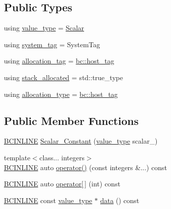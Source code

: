 \subsection*{Public Types}
\begin{DoxyCompactItemize}
\item 
using \hyperlink{structbc_1_1tensors_1_1exprs_1_1Scalar__Constant_a5ff7d788cce7d13ba21b5a421cb53036}{value\+\_\+type} = \hyperlink{namespacebc_aa12ac55ee2c43dc082894dd3859daee1}{Scalar}
\item 
using \hyperlink{structbc_1_1tensors_1_1exprs_1_1Scalar__Constant_a06478729344f3ef5709f7a44075d76ba}{system\+\_\+tag} = System\+Tag
\item 
using \hyperlink{structbc_1_1tensors_1_1exprs_1_1Scalar__Constant_ade9d036a5efd1c6d90c2eb03841892e1}{allocation\+\_\+tag} = \hyperlink{structbc_1_1host__tag}{bc\+::host\+\_\+tag}
\item 
using \hyperlink{structbc_1_1tensors_1_1exprs_1_1Scalar__Constant_a33561cf2b74145fe0d832fab9b624921}{stack\+\_\+allocated} = std\+::true\+\_\+type
\item 
using \hyperlink{structbc_1_1tensors_1_1exprs_1_1Scalar__Constant_a9e3e003a807bb461f0120f993e2d36e5}{allocation\+\_\+type} = \hyperlink{structbc_1_1host__tag}{bc\+::host\+\_\+tag}
\end{DoxyCompactItemize}
\subsection*{Public Member Functions}
\begin{DoxyCompactItemize}
\item 
\hyperlink{common_8h_a6699e8b0449da5c0fafb878e59c1d4b1}{B\+C\+I\+N\+L\+I\+NE} \hyperlink{structbc_1_1tensors_1_1exprs_1_1Scalar__Constant_a1543669f3bcf2c429d7fc1b15901c35e}{Scalar\+\_\+\+Constant} (\hyperlink{structbc_1_1Shape_3_010_01_4_a342cb50fc2de91d730a07750321bf986}{value\+\_\+type} scalar\+\_\+)
\item 
{\footnotesize template$<$class... integers$>$ }\\\hyperlink{common_8h_a6699e8b0449da5c0fafb878e59c1d4b1}{B\+C\+I\+N\+L\+I\+NE} auto \hyperlink{structbc_1_1tensors_1_1exprs_1_1Scalar__Constant_afc4637c795eced8eee778fdf86755212}{operator()} (const integers \&...) const
\item 
\hyperlink{common_8h_a6699e8b0449da5c0fafb878e59c1d4b1}{B\+C\+I\+N\+L\+I\+NE} auto \hyperlink{structbc_1_1tensors_1_1exprs_1_1Scalar__Constant_aadf4d28e113f649c9aa6ba4a71298dcb}{operator\mbox{[}$\,$\mbox{]}} (int) const
\item 
\hyperlink{common_8h_a6699e8b0449da5c0fafb878e59c1d4b1}{B\+C\+I\+N\+L\+I\+NE} const \hyperlink{structbc_1_1Shape_3_010_01_4_a342cb50fc2de91d730a07750321bf986}{value\+\_\+type} $\ast$ \hyperlink{structbc_1_1tensors_1_1exprs_1_1Scalar__Constant_ad5eeeee8d6eb30adc571f775bbb13ae1}{data} () const
\end{DoxyCompactItemize}
